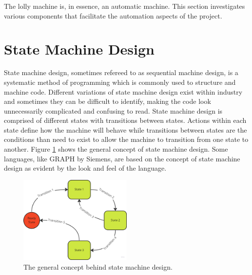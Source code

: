 
The lolly machine is, in essence, an automatic machine. This section investigates various components that facilitate the automation aspects of the project.

\section{State Machine Design}
    State machine design, sometimes refereed to as sequential machine design, is a systematic method of programming which is commonly used to structure and machine code. Different variations of state machine design exist within industry and sometimes they can be difficult to identify, making the code look unnecessarily complicated and confusing to read. State machine design is comprised of different states with transitions between states. Actions within each state define how the machine will behave while transitions between states are the conditions than need to exist to allow the machine to transition from one state to another. Figure \ref{fig:stateMachineEx} shows the general concept of state machine design. 
    Some languages, like GRAPH by Siemens, are based on the concept of state machine design as evident by the look and feel of the language\cite{siemensGraph}. 


        \begin{figure}[H]
        \centering
        \includegraphics[width = 0.5\textwidth]{2_images/stateMachineEx}
        \caption{The general concept behind state machine design.}
        \label{fig:stateMachineEx}
    \end{figure}

